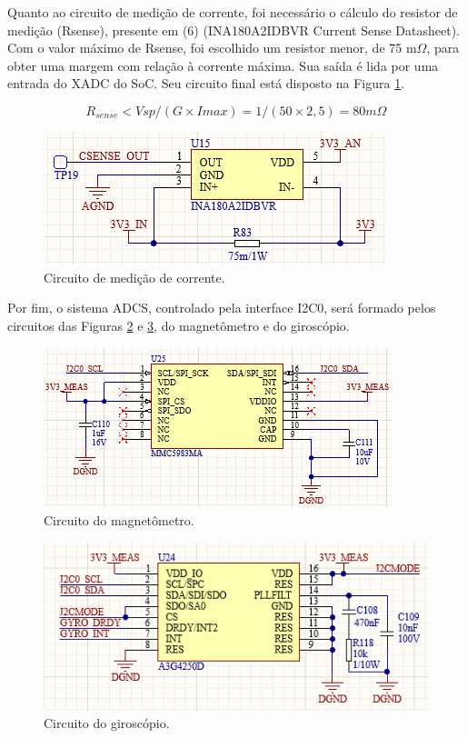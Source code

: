 Quanto ao circuito de medição de corrente, foi necessário o cálculo do resistor de medição (Rsense), presente em (6) (INA180A2IDBVR Current Sense Datasheet). Com o valor máximo de Rsense, foi escolhido um resistor menor, de 75 m$\Omega$, para obter uma margem com relação à corrente máxima. Sua saída é lida por uma entrada do XADC do SoC. Seu circuito final está disposto na Figura \ref{fig:csense}.

\begin{equation}
	R_{sense} < Vsp / (G \times Imax) = 1 / (50 \times 2,5) = 80 m\Omega
\end{equation} 

\begin{figure}[H]
    \centering
    \includegraphics[scale=0.7]{images/current sense.png}
    \caption{Circuito de medição de corrente.}
    \label{fig:csense}
\end{figure}

Por fim, o sistema ADCS, controlado pela interface I2C0, será formado pelos circuitos das Figuras \ref{fig:mag} e \ref{fig:gyro}, do magnetômetro e do giroscópio. 

\begin{figure}[H]
    \centering
    \includegraphics[scale=0.7]{images/magnetometer.png}
    \caption{Circuito do magnetômetro.}
    \label{fig:mag}
\end{figure}

\begin{figure}[H]
    \centering
    \includegraphics[scale=0.7]{images/gyro.png}
    \caption{Circuito do giroscópio.}
    \label{fig:gyro}
\end{figure}

